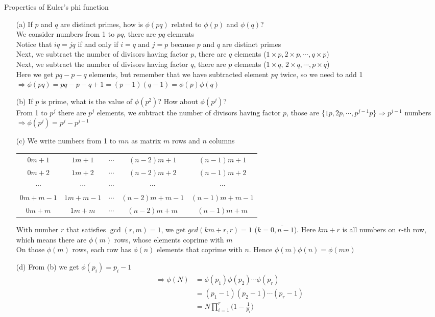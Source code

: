 \begin{exer}[3.5] Properties of Euler's phi function
	\begin{enumerate}
		\item [(a)] If $p$ and $q$ are distinct primes, how is $\phi(pq)$ related to $\phi(p)$ and $\phi(q)$? \\ We consider numbers from 1 to $pq$, there are $pq$ elements \\ Notice that $iq = jq$ if and only if $i=q$ and $j=p$ because $p$ and $q$ are distinct primes \\ Next, we subtract the number of divisors having factor $p$, there are $q$ elements ($1 \times p, 2 \times p, \cdots, q \times p$) \\ Next, we subtract the number of divisors having factor $q$, there are $p$ elements ($1 \times q$, $2 \times q, \cdots, p \times q$) \\ Here we get $pq - p - q$ elements, but remember that we have subtracted element $pq$ twice, so we need to add 1 \\ $\Rightarrow \phi(pq) = pq - p - q + 1 = (p-1)(q-1) = \phi(p)\phi(q)$
		\item [(b)] If $p$ is prime, what is the value of $\phi(p^2)$? How about $\phi(p^j)$? \\ From 1 to $p^j$ there are $p^j$ elements, we subtract the number of divisors having factor $p$, those are $\{1p, 2p, \cdots, p^{j-1}p\} \Rightarrow p^{j-1}$ numbers \\ $\Rightarrow \phi(p^j) = p^j - p^{j-1}$
		\item [(c)] We write numbers from 1 to $mn$ as matrix $m$ rows and $n$ columns
		\begin{center}
			\begin{tabular}{c c c c c}
				$0m+1$ & $1m+1$ & $\cdots$ & $(n-2)m+1$ & $(n-1)m+1$ \\ $0m+2$ & $1m+2$ & $\cdots$ & $(n-2)m+2$ & $(n-1)m+2$ \\ $\cdots$ & $\cdots$ & $\cdots$ & $\cdots$ & $\cdots$ \\ $0m + m-1$ & $1m + m-1$ & $\cdots$ & $(n-2)m + m-1$ & $(n-1)m + m - 1$ \\ $0m + m$ & $1 m + m$ & $\cdots$ & $(n-2)m + m$ & $(n-1)m + m$
			\end{tabular}
		\end{center}
		With number $r$ that satisfies $\gcd(r,m)=1$, we get $gcd(km+r,r)=1$ ($k=\overline{0, n-1}$). Here $km+r$ is all numbers on $r$-th row, which means there are $\phi(m)$ rows, whose elements coprime with $m$ \\ On those $\phi(m)$ rows, each row has $\phi(n)$ elements that coprime with $n$. Hence $\phi(m)\phi(n)=\phi(mn)$
		\item [(d)] From (b) we get $\phi(p_i) = p_i - 1$
		\begin{align*}
			\Rightarrow \phi(N) & = \phi(p_1)\phi(p_2)\cdots\phi(p_r) \\ & = (p_1 - 1)(p_2 -1)\cdots(p_r-1) \\ & = N\prod_{i=1}^{r}\Bigg(1-\frac{1}{p_i}\Bigg)
		\end{align*}
	\end{enumerate}
\end{exer}

